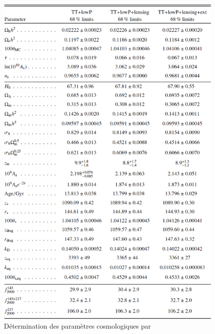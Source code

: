 



\begin{figure}
        \includegraphics[width=.95\linewidth]{img/01/table_planck2.pdf} 
        \caption[Tables paramètres cosmologique]{Détermination des paramètres cosmologiques par \cite{planck_collaboration_planck_2016} }
 		\label{fig:planck_parameters}
\end{figure}
%
%
%
